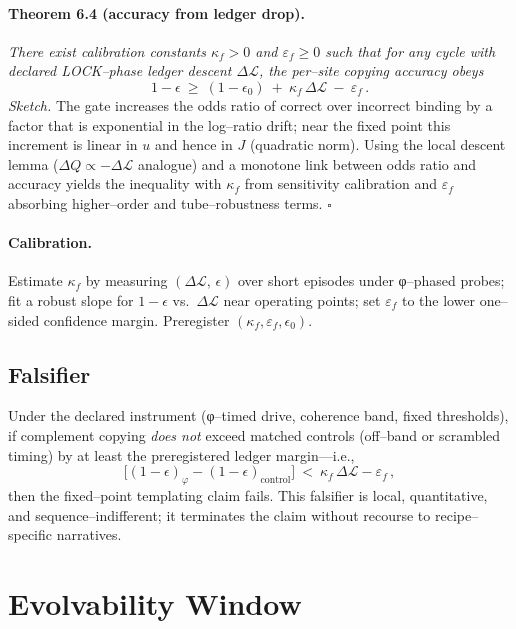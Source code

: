\documentclass[11pt]{article}
\begin{document}
\paragraph{Theorem 6.4 (accuracy from ledger drop).}
\emph{There exist calibration constants $\kappa_f>0$ and $\varepsilon_f\ge 0$ such that for any cycle with declared LOCK–phase ledger descent $\Delta\mathcal{L}$, the per–site copying accuracy obeys}
\[
1-\epsilon\ \ge\ (1-\epsilon_0)\ +\ \kappa_f\,\Delta\mathcal{L}\ -\ \varepsilon_f\,.
\]
\emph{Sketch.} The gate increases the odds ratio of correct over incorrect binding by a factor that is exponential in the log–ratio drift; near the fixed point this increment is linear in $u$ and hence in $J$ (quadratic norm). Using the local descent lemma ($\Delta Q \propto -\Delta\mathcal{L}$ analogue) and a monotone link between odds ratio and accuracy yields the inequality with $\kappa_f$ from sensitivity calibration and $\varepsilon_f$ absorbing higher–order and tube–robustness terms. \hfill$\square$

\paragraph{Calibration.}
Estimate $\kappa_f$ by measuring $(\Delta\mathcal{L},\,\epsilon)$ over short episodes under φ–phased probes; fit a robust slope for $1-\epsilon$ vs.\ $\Delta\mathcal{L}$ near operating points; set $\varepsilon_f$ to the lower one–sided confidence margin. Preregister $(\kappa_f,\varepsilon_f,\epsilon_0)$.

\subsection{Falsifier}\label{sec:fp-falsifier}
Under the declared instrument (φ–timed drive, coherence band, fixed thresholds), if complement copying \emph{does not} exceed matched controls (off–band or scrambled timing) by at least the preregistered ledger margin—i.e.,
\[
\big[(1-\epsilon)_{\varphi}- (1-\epsilon)_{\text{control}}\big]\ <\ \kappa_f\,\Delta\mathcal{L} - \varepsilon_f\,,
\]
then the fixed–point templating claim fails. This falsifier is local, quantitative, and sequence–indifferent; it terminates the claim without recourse to recipe–specific narratives.

\section{Evolvability Window}\label{sec:evolvability}
\end{document}
